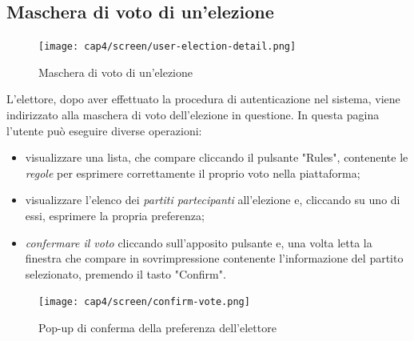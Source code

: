 \subsection{Maschera di voto di un'elezione}
\begin{figure}[!h]
    \centering 
    \texttt{[image: cap4/screen/user-election-detail.png]} 
    \caption{Maschera di voto di un'elezione}
\end{figure}
\noindent L'elettore, dopo aver effettuato la procedura di autenticazione nel sistema, viene indirizzato alla maschera di voto dell'elezione in questione. In questa pagina l'utente può eseguire diverse operazioni:
\begin{itemize}
    \item visualizzare una lista, che compare cliccando il pulsante "Rules", contenente le \textit{regole} per esprimere correttamente il proprio voto nella piattaforma;
    \item visualizzare l'elenco dei \textit{partiti partecipanti} all'elezione e, cliccando su uno di essi, esprimere la propria preferenza;
    \item \textit{confermare il voto} cliccando sull'apposito pulsante e, una volta letta la finestra che compare in sovrimpressione contenente l'informazione del partito selezionato, premendo il tasto "Confirm".
\end{itemize}
\begin{figure}[H] 
    \centering 
    \texttt{[image: cap4/screen/confirm-vote.png]} 
    \caption{Pop-up di conferma della preferenza dell'elettore}
\end{figure}
